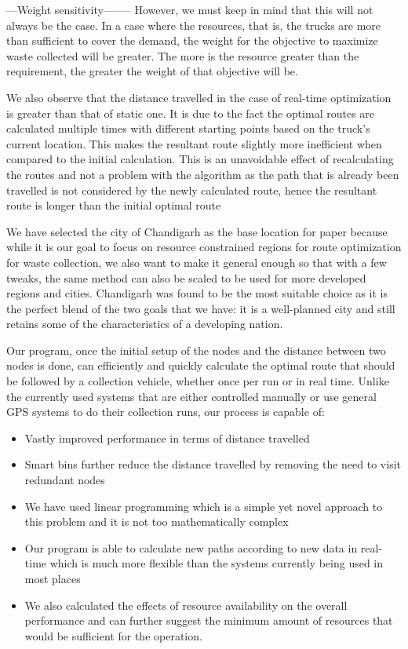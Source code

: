 \documentclass[12pt]{article}
\begin{document}
---Weight sensitivity--------
However, we must keep in mind that this will not always be the case. In a case where the resources, that is, the trucks are more than sufficient to cover the demand, the weight for the objective to maximize waste collected will be greater. The more is the resource greater than the requirement, the greater the weight of that objective will be.

We also observe that the distance travelled in the case of real-time optimization is greater than that of static one. It is due to the fact the optimal routes are calculated multiple times with different starting points based on the truck's current location. This makes the resultant route slightly more inefficient when compared to the initial calculation. This is an unavoidable effect of recalculating the routes and not a problem with the algorithm as the path that is already been travelled is not considered by the newly calculated route, hence the resultant route is longer than the initial optimal route

We have selected the city of Chandigarh as the base location for paper because while it is our goal to focus on resource constrained regions for route optimization for waste collection, we also want to make it general enough so that with a few tweaks, the same method can also be scaled to be used for more developed regions and cities. Chandigarh was found to be the most suitable choice as it is the perfect blend of the two goals that we have: it is a well-planned city and still retains some of the characteristics of a developing nation.

Our program, once the initial setup of the nodes and the distance between two nodes is done, can efficiently and quickly calculate the optimal route that should be followed by a collection vehicle, whether once per run or in real time. Unlike the currently used systems that are either controlled manually or use general GPS systems to do their collection runs, our process is capable of:
\begin{itemize}
    \item Vastly improved performance in terms of distance travelled
    \item Smart bins further reduce the distance travelled by removing the need to visit redundant nodes
    \item We have used linear programming which is a simple yet novel approach to this problem and it is not too mathematically complex
    \item Our program is able to calculate new paths according to new data in real-time which is much more flexible than the systems currently being used in most places
    \item We also calculated the effects of resource availability on the overall performance and can further suggest the minimum amount of resources that would be sufficient for the operation.
\end{itemize}
\end{document}

